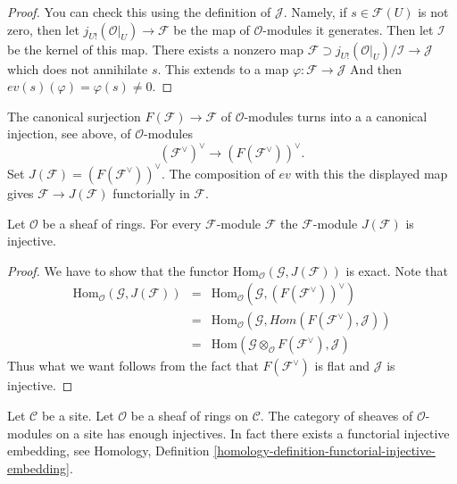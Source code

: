\begin{proof}
You can check this using the definition of $\mathcal{J}$.
Namely, if $s \in \mathcal{F}(U)$ is not zero, then let
$j_{U!}(\mathcal{O}|_U) \to \mathcal{F}$ be the map of
$\mathcal{O}$-modules it generates. Then let $\mathcal{I}$
be the kernel of this map. There exists
a nonzero map $\mathcal{F} \supset j_{U!}(\mathcal{O}|_U)/\mathcal{I}
\to \mathcal{J}$ which does not annihilate $s$. This extends to a map
$\varphi : \mathcal{F} \to \mathcal{J}$
And then $ev(s)(\varphi) = \varphi(s) \not = 0$.
\end{proof}

\noindent
The canonical surjection
$F(\mathcal{F}) \to \mathcal{F}$ of $\mathcal{O}$-modules turns into a
a canonical injection, see above, of $\mathcal{O}$-modules 
$$
(\mathcal{F}^\vee)^\vee \longrightarrow (F(\mathcal{F}^\vee))^\vee.
$$
Set $J(\mathcal{F}) = (F(\mathcal{F}^\vee))^\vee$.
The composition of $ev$ with this
the displayed map gives
$\mathcal{F} \to J(\mathcal{F})$ functorially in $\mathcal{F}$.

\begin{lemma}
\label{lemma-JM-injective-sheaves}
Let $\mathcal{O}$ be a sheaf of rings.
For every $\mathcal{F}$-module $\mathcal{F}$ the
$\mathcal{F}$-module $J(\mathcal{F})$ is injective.
\end{lemma}

\begin{proof}
We have to show that the functor
$\text{Hom}_\mathcal{O}(\mathcal{G}, J(\mathcal{F}))$
is exact. Note that
\begin{eqnarray*}
\text{Hom}_\mathcal{O}(\mathcal{G}, J(\mathcal{F}))
& = &
\text{Hom}_\mathcal{O}(\mathcal{G}, (F(\mathcal{F}^\vee))^\vee) \\
& = &
\text{Hom}_\mathcal{O}
(\mathcal{G}, \textit{Hom}(F(\mathcal{F}^\vee), \mathcal{J})) \\
& = &
\text{Hom}(\mathcal{G} \otimes_{\mathcal{O}} F(\mathcal{F}^\vee), \mathcal{J})
\end{eqnarray*}
Thus what we want follows from the fact that $F(\mathcal{F}^\vee)$
is flat and $\mathcal{J}$ is injective.
\end{proof}

\begin{theorem}
\label{theorem-sheaves-modules-injectives}
Let $\mathcal{C}$ be a site.
Let $\mathcal{O}$ be a sheaf of rings on $\mathcal{C}$.
The category of sheaves of $\mathcal{O}$-modules on a
site has enough injectives. In fact there exists
a functorial injective embedding, see
Homology, Definition \ref{homology-definition-functorial-injective-embedding}.
\end{theorem}

